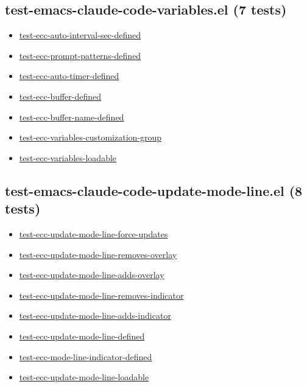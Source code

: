 \documentclass[11pt]{article}
\begin{document}
\subsection{test-emacs-claude-code-variables.el (7 tests)}
\label{sec:org0417b2f}
\begin{itemize}
\item \href{test-emacs-claude-code-variables.el}{test-ecc-auto-interval-sec-defined}
\item \href{test-emacs-claude-code-variables.el}{test-ecc-prompt-patterns-defined}
\item \href{test-emacs-claude-code-variables.el}{test-ecc-auto-timer-defined}
\item \href{test-emacs-claude-code-variables.el}{test-ecc-buffer-defined}
\item \href{test-emacs-claude-code-variables.el}{test-ecc-buffer-name-defined}
\item \href{test-emacs-claude-code-variables.el}{test-ecc-variables-customization-group}
\item \href{test-emacs-claude-code-variables.el}{test-ecc-variables-loadable}
\end{itemize}
\subsection{test-emacs-claude-code-update-mode-line.el (8 tests)}
\label{sec:org5846a7f}
\begin{itemize}
\item \href{test-emacs-claude-code-update-mode-line.el}{test-ecc-update-mode-line-force-updates}
\item \href{test-emacs-claude-code-update-mode-line.el}{test-ecc-update-mode-line-removes-overlay}
\item \href{test-emacs-claude-code-update-mode-line.el}{test-ecc-update-mode-line-adds-overlay}
\item \href{test-emacs-claude-code-update-mode-line.el}{test-ecc-update-mode-line-removes-indicator}
\item \href{test-emacs-claude-code-update-mode-line.el}{test-ecc-update-mode-line-adds-indicator}
\item \href{test-emacs-claude-code-update-mode-line.el}{test-ecc-update-mode-line-defined}
\item \href{test-emacs-claude-code-update-mode-line.el}{test-ecc-mode-line-indicator-defined}
\item \href{test-emacs-claude-code-update-mode-line.el}{test-ecc-update-mode-line-loadable}
\end{itemize}
\end{document}
